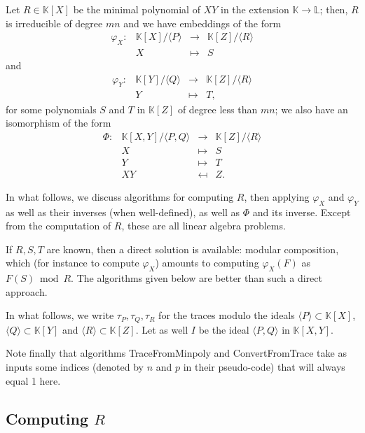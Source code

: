 \documentclass[12pt]{article}
\def\M {\ensuremath{\mathsf{M}}}
\def\K {\ensuremath{\mathbb{K}}}
\def\L {\ensuremath{\mathbb{L}}}
\begin{document}
Let $R \in \K[X]$ be the minimal polynomial of $XY$ in the extension
$\K\to \L$; then, $R$ is irreducible of degree $m n$ and we have embeddings
of the form
$$\begin{array}{cccc}
\varphi_X: & \K[X]/\langle P \rangle & \to & \K[Z]/\langle R \rangle\\
& X & \mapsto & S
\end{array}$$
and
$$\begin{array}{cccc}
\varphi_Y: & \K[Y]/\langle Q \rangle & \to & \K[Z]/\langle R \rangle\\
& Y & \mapsto & T,
\end{array}$$
for some polynomials $S$ and $T$ in $\K[Z]$ of degree less than $mn$; 
we also have an isomorphism of the form
$$\begin{array}{cccc} 
\Phi:&  \K[X,Y]/\langle P,Q\rangle & \to & \K[Z]/\langle R \rangle \\
&  X & \mapsto & S \\
&  Y & \mapsto & T \\
&  XY & \mapsfrom & Z.
\end{array}$$

In what follows, we discuss algorithms for computing $R$, then
applying $\varphi_X$ and $\varphi_Y$ as well as their inverses (when
well-defined), as well as $\Phi$ and its inverse. Except from the
computation of $R$, these are all linear algebra problems. 

If $R,S,T$ are known, then a direct solution is available: modular
composition, which (for instance to compute $\varphi_X$) amounts to
computing $\varphi_X(F)$ as $F(S) \bmod R$. The algorithms given below
are better than such a direct approach.

In what follows, we write $\tau_P,\tau_Q,\tau_R$ for the traces modulo
the ideals $\langle P\rangle\subset \K[X]$, $\langle Q \rangle \subset
\K[Y]$ and $\langle R \rangle \subset \K[Z]$. Let as well $I$ be the ideal
$\langle P, Q\rangle$ in $\K[X,Y]$.

Note finally that algorithms TraceFromMinpoly and ConvertFromTrace
take as inputs some indices (denoted by $n$ and $p$ in their
pseudo-code) that will always equal 1 here.



\subsection{Computing $R$} 
\end{document}
